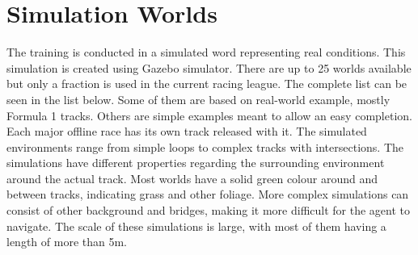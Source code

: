 \section{Simulation Worlds}
The training is conducted in a simulated word representing real conditions. This simulation is created using Gazebo simulator. There are up to 25 worlds available but only a fraction is used in the current racing league. The complete list can be seen in the list below. Some of them are based on real-world example, mostly Formula 1 tracks. Others are simple examples meant to allow an easy completion. Each major offline race has its own track released with it. The simulated environments range from simple loops to complex tracks with intersections. The simulations have different properties regarding the surrounding environment around the actual track. Most worlds have a solid green colour around and between tracks, indicating grass and other foliage. More complex simulations can consist of other background and bridges, making it more difficult for the agent to navigate. The scale of these simulations is large, with most of them having a length of more than 5m.
